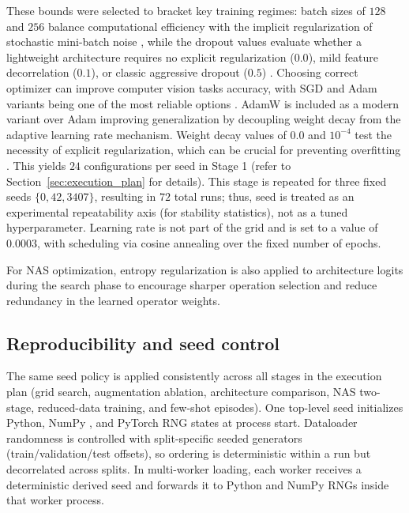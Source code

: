 \documentclass[cameraready]{Interspeech}
\begin{document}
These bounds were selected to bracket key training regimes: batch sizes of $128$ and $256$ balance computational efficiency with the implicit regularization of stochastic mini-batch noise \cite{masters2018revisiting}, while the dropout values evaluate whether a lightweight architecture requires no explicit regularization ($0.0$), mild feature decorrelation ($0.1$), or classic aggressive dropout ($0.5$) \cite{srivastava2014dropout}. Choosing correct optimizer can improve computer vision tasks accuracy, with SGD and Adam variants being one of the most reliable options \cite{Hassan2023}. AdamW \cite{adamw} is included as a modern variant over Adam improving generalization by decoupling weight decay from the adaptive learning rate mechanism. Weight decay values of $0.0$ and $10^{-4}$ test the necessity of explicit regularization, which can be crucial for preventing overfitting \cite{NEURIPS2024_29496c94}.
This yields $24$ configurations per seed in Stage 1 (refer to Section~\ref{sec:execution_plan} for details). This stage is repeated for three fixed seeds $\{0, 42, 3407\}$, resulting in $72$ total runs; thus, seed is treated as an experimental repeatability axis (for stability statistics), not as a tuned hyperparameter. Learning rate is not part of the grid and is set to a value of $0.0003$, with scheduling via cosine annealing \cite{loshchilov2016sgdr} over the fixed number of epochs.

For NAS optimization, entropy regularization is also applied to architecture logits during the search phase to encourage sharper operation selection and reduce redundancy in the learned operator weights.

\subsection{Reproducibility and seed control}
The same seed policy is applied consistently across all stages in the execution plan (grid search, augmentation ablation, architecture comparison, NAS two-stage, reduced-data training, and few-shot episodes). One top-level seed initializes Python, NumPy \cite{harris2020array}, and PyTorch \cite{NEURIPS2019_9015} RNG states at process start. Dataloader randomness is controlled with split-specific seeded generators (train/validation/test offsets), so ordering is deterministic within a run but decorrelated across splits. In multi-worker loading, each worker receives a deterministic derived seed and forwards it to Python and NumPy RNGs inside that worker process.
\end{document}
